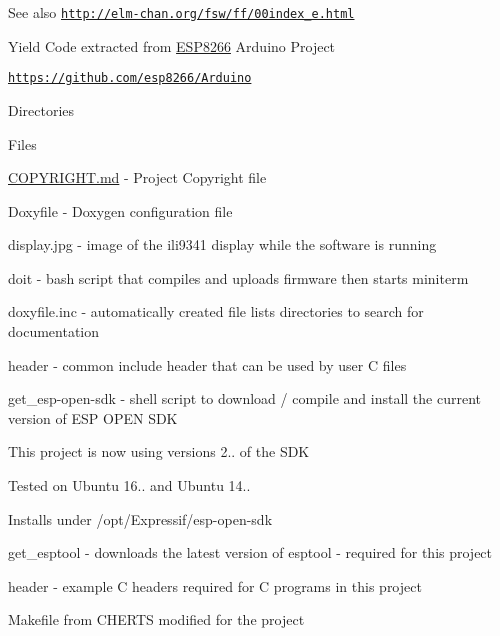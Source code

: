 \begin{DoxySeeAlso}{See also}
\href{http://elm-chan.org/fsw/ff/00index_e.html}{\tt http\+://elm-\/chan.\+org/fsw/ff/00index\+\_\+e.\+html}
\begin{DoxyItemize}
\item Yield Code extracted from \hyperlink{cpu_8h_af917fb5672b9339e228304f59f3b250a}{E\+S\+P8266} Arduino Project 
\end{DoxyItemize}

\href{https://github.com/esp8266/Arduino}{\tt https\+://github.\+com/esp8266/\+Arduino} 


\end{DoxySeeAlso}
\begin{DoxyParagraph}{Directories}

\begin{DoxyItemize}
\item Files
\begin{DoxyItemize}
\item \hyperlink{COPYRIGHT_8md}{C\+O\+P\+Y\+R\+I\+G\+H\+T.\+md} -\/ Project Copyright file
\item Doxyfile -\/ Doxygen configuration file
\item display.\+jpg -\/ image of the ili9341 display while the software is running
\item doit -\/ bash script that compiles and uploads firmware then starts miniterm
\item doxyfile.\+inc -\/ automatically created file lists directories to search for documentation
\item header -\/ common include header that can be used by user C files
\item get\+\_\+esp-\/open-\/sdk -\/ shell script to download / compile and install the current version of E\+SP O\+P\+EN S\+DK
\begin{DoxyItemize}
\item This project is now using versions 2.. of the S\+DK
\item Tested on Ubuntu 16.. and Ubuntu 14..
\item Installs under /opt/\+Expressif/esp-\/open-\/sdk
\end{DoxyItemize}
\item get\+\_\+esptool -\/ downloads the latest version of esptool -\/ required for this project
\item header -\/ example C headers required for C programs in this project
\item Makefile from C\+H\+E\+R\+TS modified for the project
\begin{DoxyItemize}

\end{DoxyItemize}
\end{DoxyItemize}
\end{DoxyItemize}
\end{DoxyParagraph}
